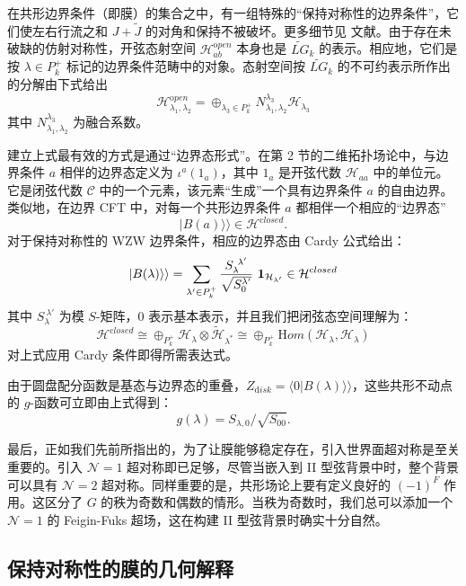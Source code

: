 \documentclass[11pt,a4paper]{ctexart}
\begin{document}
在共形边界条件（即膜）的集合之中，有一组特殊的``保持对称性的边界条件''，它们使左右行流之和 \(J + \tilde J\) 的对角和保持不被破坏。更多细节见 文献。由于存在未破缺的仿射对称性，开弦态射空间 \({\mathcal H}_{ab}^{\mathrm open}\) 本身也是 \(\widetilde{LG}_k\) 的表示。相应地，它们是按 \(\lambda\in P^+_k\) 标记的边界条件范畴中的对象。态射空间按 \(\widetilde{LG}_k\) 的不可约表示所作出的分解由下式给出 \[{\mathcal H}_{\lambda_1, \lambda_2}^{\mathrm open}
 = \oplus_{ \lambda_3\in P^+_k} N^{  \lambda_3}_{\lambda_1, \lambda_2} {\mathcal H}_{  \lambda_3}\] 其中 \(N^{  \lambda_3}_{\lambda_1,
\lambda_2}\) 为融合系数。

建立上式最有效的方式是通过``边界态形式''。在第 2 节的二维拓扑场论中，与边界条件 \(a\) 相伴的边界态定义为 \(\iota^{a}(1_a)\)，其中 \(1_a\) 是开弦代数 \({\mathcal H}_{aa}\) 中的单位元。它是闭弦代数 \({\mathcal C}\) 中的一个元素，该元素``生成''一个具有边界条件 \(a\) 的自由边界。类似地，在边界 CFT 中，对每一个共形边界条件 \(a\) 都相伴一个相应的``边界态'' \[\vert B(a)\rangle\rangle \in {\mathcal H}^{\mathrm closed}.\] 对于保持对称性的 WZW 边界条件，相应的边界态由 Cardy 公式给出： \[\vert B(\lambda) \rangle\rangle= \sum_{\lambda'\in P^+_k} {S_{\lambda}^{~\lambda'} \over \sqrt{
S_{0}^{\lambda'} }} ~ {\mathbf 1}_{{\mathcal H}_{\lambda'}} \in {\mathcal H}^{\mathrm closed}\] 其中 \(S_{\lambda}^{~\lambda'}\) 为模 \(S\)-矩阵，\(0\) 表示基本表示，并且我们把闭弦态空间理解为： \[{\mathcal H}^{\mathrm closed}
\cong \oplus_{ P^+_k} {\mathcal H}_\lambda \otimes \tilde {\mathcal H}_{\lambda^*}
  \cong
 \oplus_{ P^+_k}   {\mathrm Hom}({\mathcal H}_{ \lambda} , {\mathcal H}_{\lambda} )\] 对上式应用 Cardy 条件即得所需表达式。

由于圆盘配分函数是基态与边界态的重叠，\(Z_{\mathrm disk} = \langle 0 \vert B(\lambda)\rangle\rangle\)，这些共形不动点的 \(g\)-函数可立即由上式得到： \[g(\lambda) = S_{\lambda,0}/\sqrt{S_{00}} .\]

最后，正如我们先前所指出的，为了让膜能够稳定存在，引入世界面超对称是至关重要的。引入 \({\mathcal N}=1\) 超对称即已足够，尽管当嵌入到 II 型弦背景中时，整个背景可以具有 \({\mathcal N}=2\) 超对称。同样重要的是，共形场论上要有定义良好的 \((-1)^F\) 作用。这区分了 \(G\) 的秩为奇数和偶数的情形。当秩为奇数时，我们总可以添加一个 \({\mathcal N}=1\) 的 Feigin-Fuks 超场，这在构建 II 型弦背景时确实十分自然。

\subsection{保持对称性的膜的几何解释}\label{ux4fddux6301ux5bf9ux79f0ux6027ux7684ux819cux7684ux51e0ux4f55ux89e3ux91ca}
\end{document}
